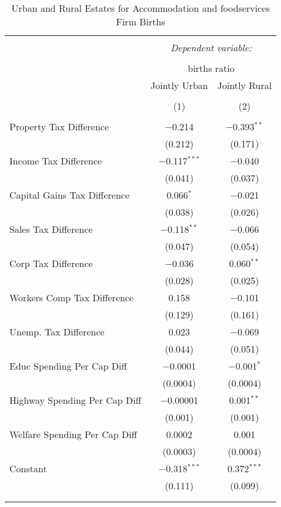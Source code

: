 
\begin{table}[!htbp] \centering 
  \caption{Urban and Rural Estates for  Accommodation and foodservices Firm Births} 
  \label{} 
\begin{tabular}{@{\extracolsep{5pt}}lcc} 
\\[-1.8ex]\hline 
\hline \\[-1.8ex] 
 & \multicolumn{2}{c}{\textit{Dependent variable:}} \\ 
\cline{2-3} 
\\[-1.8ex] & \multicolumn{2}{c}{births ratio} \\ 
 & Jointly Urban & Jointly Rural \\ 
\\[-1.8ex] & (1) & (2)\\ 
\hline \\[-1.8ex] 
 Property Tax Difference & $-$0.214 & $-$0.393$^{**}$ \\ 
  & (0.212) & (0.171) \\ 
  Income Tax Difference & $-$0.117$^{***}$ & $-$0.040 \\ 
  & (0.041) & (0.037) \\ 
  Capital Gains Tax Difference & 0.066$^{*}$ & $-$0.021 \\ 
  & (0.038) & (0.026) \\ 
  Sales Tax Difference & $-$0.118$^{**}$ & $-$0.066 \\ 
  & (0.047) & (0.054) \\ 
  Corp Tax Difference & $-$0.036 & 0.060$^{**}$ \\ 
  & (0.028) & (0.025) \\ 
  Workers Comp Tax Difference & 0.158 & $-$0.101 \\ 
  & (0.129) & (0.161) \\ 
  Unemp. Tax Difference & 0.023 & $-$0.069 \\ 
  & (0.044) & (0.051) \\ 
  Educ Spending Per Cap Diff & $-$0.0001 & $-$0.001$^{*}$ \\ 
  & (0.0004) & (0.0004) \\ 
  Highway Spending Per Cap Diff & $-$0.00001 & 0.001$^{**}$ \\ 
  & (0.001) & (0.001) \\ 
  Welfare Spending Per Cap Diff & 0.0002 & 0.001 \\ 
  & (0.0003) & (0.0004) \\ 
  Constant & $-$0.318$^{***}$ & 0.372$^{***}$ \\ 
  & (0.111) & (0.099) \\ 
 \hline \\[-1.8ex] 
\hline 
\hline \\[-1.8ex] 
\end{tabular} 
\end{table} 
